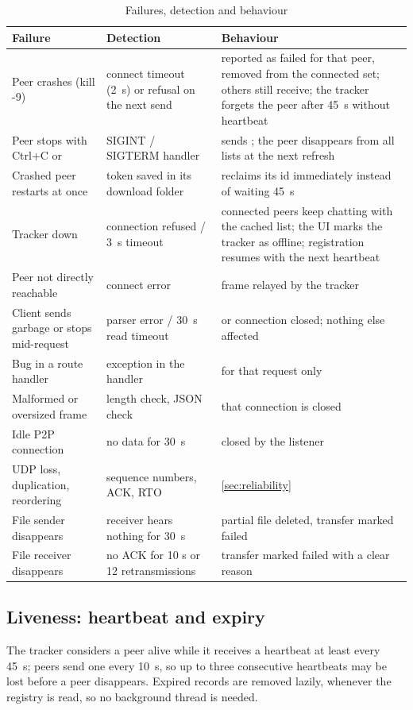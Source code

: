 \begin{table}[H]\centering\footnotesize
\caption{Failures, detection and behaviour}\label{tab:failures}
\begin{tabularx}{\textwidth}{@{}>{\raggedright\arraybackslash}p{3.3cm} >{\raggedright\arraybackslash}p{3.6cm} Y@{}}
\toprule
\textbf{Failure} & \textbf{Detection} & \textbf{Behaviour} \\
\midrule
Peer crashes (kill -9) & connect timeout (\SI{2}{s}) or refusal on the next send & reported as failed for that peer, removed from the connected set; others still receive; the tracker forgets the peer after \SI{45}{s} without heartbeat \\
Peer stops with Ctrl+C or  & SIGINT / SIGTERM handler & sends ; the peer disappears from all lists at the next refresh \\
Crashed peer restarts at once & token saved in its download folder & reclaims its id immediately instead of waiting \SI{45}{s} \\
Tracker down & connection refused / \SI{3}{s} timeout & connected peers keep chatting with the cached list; the UI marks the tracker as offline; registration resumes with the next heartbeat \\
Peer not directly reachable & connect error & frame relayed by the tracker \\
Client sends garbage or stops mid-request & parser error / \SI{30}{s} read timeout &  or connection closed; nothing else affected \\
Bug in a route handler & exception in the handler &  for that request only \\
Malformed or oversized frame & length check, JSON check & that connection is closed \\
Idle P2P connection & no data for \SI{30}{s} & closed by the listener \\
UDP loss, duplication, reordering & sequence numbers, ACK, RTO & \cref{sec:reliability} \\
File sender disappears & receiver hears nothing for \SI{30}{s} & partial file deleted, transfer marked failed \\
File receiver disappears & no ACK for 10 s or 12 retransmissions & transfer marked failed with a clear reason \\
\bottomrule
\end{tabularx}
\end{table}

\subsection{Liveness: heartbeat and expiry}
The tracker considers a peer alive while it receives a heartbeat at least every \SI{45}{s}; peers
send one every \SI{10}{s}, so up to three consecutive heartbeats may be lost before a peer disappears.
Expired records are removed lazily, whenever the registry is read, so no background thread is
needed.
